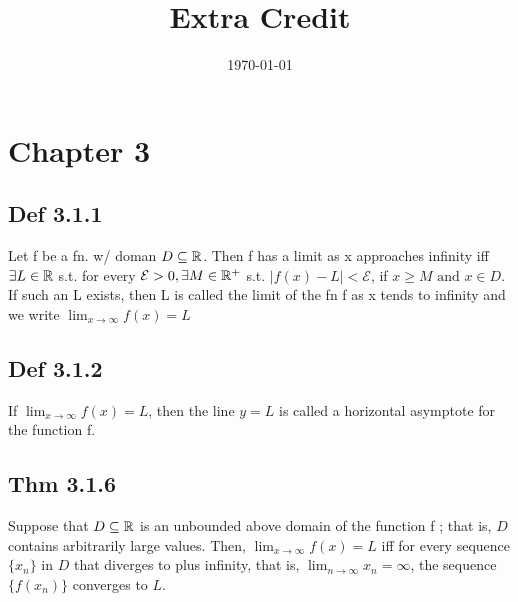 

\title{Extra Credit} %
\author{}
\date{\today} %



\maketitle

\section*{Chapter 3}

\subsection*{Def 3.1.1}
    Let f be a fn. w/ doman $D \subseteq \mathbb{R}$. Then f has a limit as x approaches infinity iff $\exists L \in \mathbb{R}$ s.t. for every $\mathcal{E} > 0, \exists M \in \mathbb{R}^+$ s.t. $|f(x) - L| < \mathcal{E}$, if $x \ge M \text{ and } x \in D$.
    If such an L exists, then L is called the limit of the fn f as x tends to infinity and we write $\lim_{x \to \infty} f(x) = L$

\subsection*{Def 3.1.2}
    If $\lim_{x \to \infty} f (x) = L$, then the line $y = L$ is called a horizontal asymptote for the function f.
\subsection*{Thm 3.1.6}
    Suppose that $D \subseteq \mathbb{R}$ is an unbounded above domain of the function f ; that is, $D$ contains arbitrarily large values. Then, $\lim_{x \to \infty} f (x) = L$ iff for every sequence $\{ x_n \}$ in $D$ that diverges to plus infinity, that is, $\lim_{n \to \infty} x_n = \infty$, the sequence $\{ f (x_n) \}$ converges to $L$.

